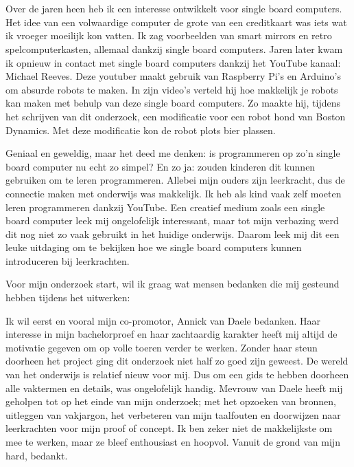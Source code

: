 
\chapter*{}
\label{ch:voorwoord}


Over de jaren heen heb ik een interesse ontwikkelt voor single board computers. Het idee van een volwaardige computer de grote van een creditkaart was iets wat ik vroeger moeilijk kon vatten. Ik zag voorbeelden van smart mirrors en retro spelcomputerkasten, allemaal dankzij single board computers. Jaren later kwam ik opnieuw in contact met single board computers dankzij het YouTube kanaal: Michael Reeves. Deze youtuber maakt gebruik van Raspberry Pi's en Arduino's om absurde robots te maken. In zijn video's verteld hij hoe makkelijk je robots kan maken met behulp van deze single board computers.  Zo maakte hij, tijdens het schrijven van dit onderzoek, een modificatie voor een robot hond van Boston Dynamics. Met deze modificatie kon de robot plots bier plassen. 

Geniaal en geweldig, maar het deed me denken: is programmeren op zo'n single board computer nu echt zo simpel? En zo ja: zouden kinderen dit kunnen gebruiken om te leren programmeren. Allebei mijn ouders zijn leerkracht, dus de connectie maken met onderwijs was makkelijk. Ik heb als kind vaak zelf moeten leren programmeren dankzij YouTube. Een creatief medium zoals een single board computer leek mij ongelofelijk interessant, maar tot mijn verbazing werd dit nog niet zo vaak gebruikt in het huidige onderwijs. Daarom leek mij dit een leuke uitdaging om te bekijken hoe we single board computers kunnen introduceren bij leerkrachten.

Voor mijn onderzoek start, wil ik graag wat mensen bedanken die mij gesteund hebben tijdens het uitwerken:

Ik wil eerst en vooral mijn co-promotor, Annick van Daele bedanken. Haar interesse in mijn bachelorproef en haar zachtaardig karakter heeft mij altijd de motivatie gegeven om op volle toeren verder te werken. Zonder haar steun doorheen het project ging dit onderzoek niet half zo goed zijn geweest. De wereld van het onderwijs is relatief nieuw voor mij. Dus om een gids te hebben doorheen alle vaktermen en details, was ongelofelijk handig. Mevrouw van Daele heeft mij geholpen tot op het einde van mijn onderzoek; met het opzoeken van bronnen, uitleggen van vakjargon, het verbeteren van mijn taalfouten en doorwijzen naar leerkrachten voor mijn proof of concept. Ik ben zeker niet de makkelijkste om mee te werken, maar ze bleef enthousiast en hoopvol. Vanuit de grond van mijn hard, bedankt.

